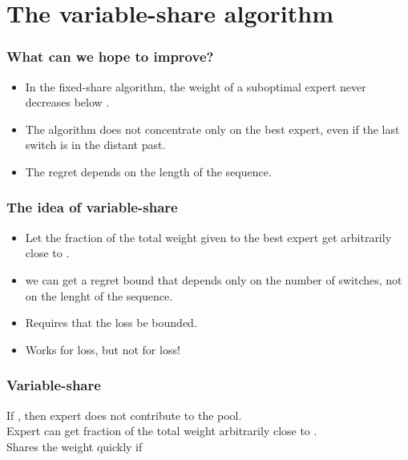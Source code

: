 \documentclass{beamer}
\begin{document}

\section{The variable-share algorithm}

\begin{frame}
\frametitle{What can we hope to improve?}
\begin{itemize}
\item In the fixed-share algorithm, the 
weight of a suboptimal expert never decreases below
.
\item The algorithm does not concentrate only on the best expert, even
if the last switch is in the distant past.
\item The regret depends on the length of the sequence.
\end{itemize}
\end{frame}

\begin{frame}
\frametitle{The idea of variable-share}
\begin{itemize}
\item Let the fraction of the total weight given to the 
best expert get arbitrarily close to .
\item we can get a regret bound that depends only on the number of
switches, not on the lenght of the sequence.
\item Requires that the loss be bounded.
\item Works for  loss, but not for  loss!
\end{itemize}
\end{frame}

\begin{frame}
\frametitle{Variable-share}
\pause
If , then expert  does not contribute to the pool.\\
\pause
Expert can get fraction of the total weight arbitrarily close to .\\
\pause
Shares the weight quickly if 
\end{frame}
\end{document}

